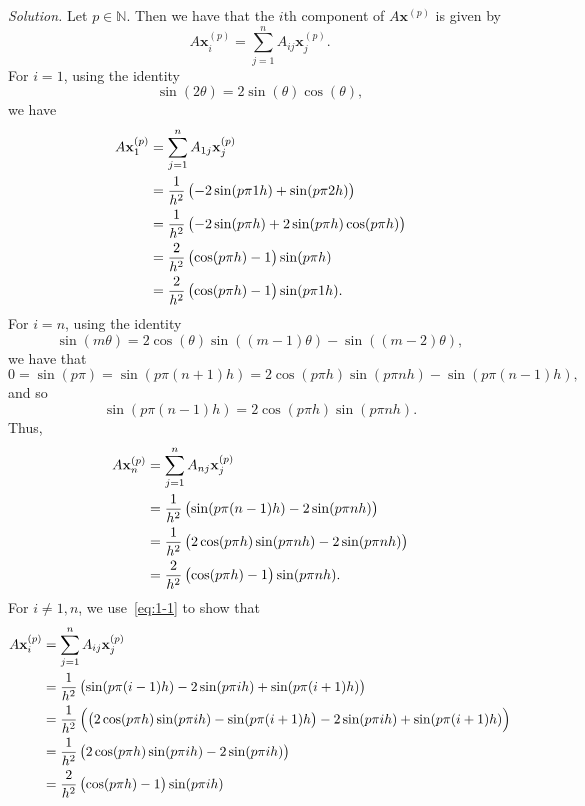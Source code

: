\documentclass{article}
\def\*#1{\mathbf{#1}}
\newcommand{\N}{\mathbb{N}}
\begin{document}
\textit{Solution.}
Let $p \in \N$. Then we have that the $i$th component of $A \*x^{(p)}$ is given by
%
\begin{equation*}
    A \*x^{(p)}_i
    = \sum_{j = 1}^n A_{ij} \*x^{(p)}_j
    .
\end{equation*}
%
For $i = 1$, using the identity
%
\begin{equation*}
    \sin(2 \theta) = 2 \sin(\theta) \cos(\theta)
    ,
\end{equation*}
%
we have
%
\begin{align*}
    A \*x^{(p)}_1
    &= \sum_{j = 1}^n A_{1j} \*x^{(p)}_j \\
    &= \frac{1}{h^2} \del{-2 \sin(p \pi 1 h) + \sin(p \pi 2 h)} \\
    &= \frac{1}{h^2} \del{-2 \sin(p \pi h) + 2 \sin(p \pi h) \cos(p \pi h)} \\
    &= \frac{2}{h^2} \del{\cos(p \pi h) - 1} \sin(p \pi h) \\
    &= \frac{2}{h^2} \del{\cos(p \pi h) - 1} \sin(p \pi 1 h)
    .
\end{align*}
%
For $i = n$, using the identity
%
\begin{equation}
    \sin(m \theta) = 2 \cos(\theta) \sin((m - 1) \theta) - \sin((m - 2) \theta)
    \label{eq:1-1}
    ,
\end{equation}
%
we have that
%
\begin{equation*}
    0 = \sin(p \pi) = \sin(p \pi (n + 1) h) = 2 \cos(p \pi h) \sin(p \pi n h) - \sin(p \pi (n - 1) h)
    ,
\end{equation*}
%
and so
%
\begin{equation*}
    \sin(p \pi (n - 1) h) = 2 \cos(p \pi h) \sin(p \pi n h)
    .
\end{equation*}
%
Thus,
%
\begin{align*}
    A \*x^{(p)}_n
    &= \sum_{j = 1}^n A_{nj} \*x^{(p)}_j \\
    &= \frac{1}{h^2} \del{\sin(p \pi (n - 1) h) - 2 \sin(p \pi n h)} \\
    &= \frac{1}{h^2} \del{2 \cos(p \pi h) \sin(p \pi n h) - 2 \sin(p \pi n h)} \\
    &= \frac{2}{h^2} \del{\cos(p \pi h) - 1} \sin(p \pi n h)
    .
\end{align*}
%
For $i \neq 1, n$, we use~\eqref{eq:1-1} to show that
%
\begin{align*}
    A \*x^{(p)}_i
    &= \sum_{j = 1}^n A_{ij} \*x^{(p)}_j \\
    &= \frac{1}{h^2} \del{\sin(p \pi (i - 1) h) - 2 \sin(p \pi i h) + \sin(p \pi (i + 1) h)} \\
    &= \frac{1}{h^2} \del{\del{2 \cos(p \pi h) \sin(p \pi i h) - \sin(p \pi (i + 1) h} - 2 \sin(p \pi i h) + \sin(p \pi (i + 1) h)} \\
    &= \frac{1}{h^2} \del{2 \cos(p \pi h) \sin(p \pi i h) - 2 \sin(p \pi i h)} \\
    &= \frac{2}{h^2} \del{\cos(p \pi h) - 1} \sin(p \pi i h)
\end{align*}
\end{document}
